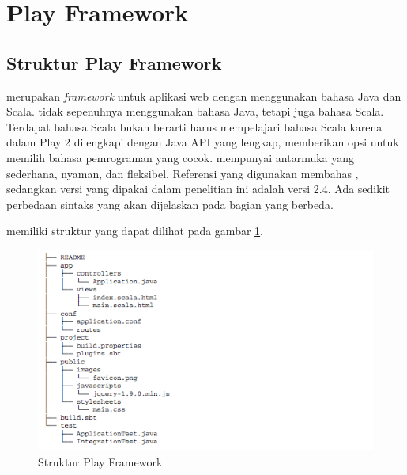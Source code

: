 \section{Play Framework}
\label{sec:play}
\subsection{Struktur Play Framework}
\play \cite{playforjava} merupakan \textit{framework} untuk aplikasi web dengan menggunakan bahasa Java dan Scala. \play tidak sepenuhnya menggunakan bahasa Java, tetapi juga bahasa Scala. Terdapat bahasa Scala bukan berarti harus mempelajari bahasa Scala karena dalam Play 2 dilengkapi dengan Java API yang lengkap, memberikan opsi untuk memilih bahasa pemrograman yang cocok. \play mempunyai antarmuka yang sederhana, nyaman, dan fleksibel. Referensi \cite{playforjava} yang digunakan membahas , sedangkan versi \play yang dipakai dalam penelitian ini adalah versi 2.4. Ada sedikit perbedaan sintaks yang akan dijelaskan pada bagian yang berbeda.
%

\play memiliki struktur yang dapat dilihat pada gambar \ref{fig:2_play_struktur}.

\begin{figure}[H]
	\centering
	\includegraphics[scale=0.7]{Gambar/play-struktur}
	\caption{Struktur Play Framework \cite{playforjava}} 
	\label{fig:2_play_struktur}
\end{figure}

